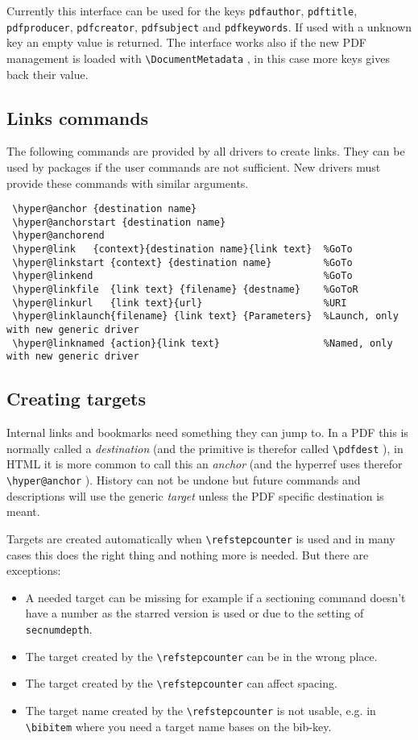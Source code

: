 \documentclass{article}
\newcommand*{\cs}[1]{%
  \texttt{\textbackslash #1}%
}
\newcommand*{\xpackage}[1]{\textsf{#1}}
\begin{document}
Currently this interface can be used for the keys \texttt{pdfauthor}, \texttt{pdftitle},
\texttt{pdfproducer},
\texttt{pdfcreator}, \texttt{pdfsubject} and \texttt{pdfkeywords}.
If used with a unknown key an empty value is returned.
The interface works also if the new PDF management is loaded with \cs{DocumentMetadata}, in this
case more keys gives back their value.


\subsection{Links commands}
The following commands are provided by all drivers to create links.
They can be used by packages if the user commands are not sufficient.
New drivers must provide these commands with similar arguments.

\begin{verbatim}
 \hyper@anchor {destination name}
 \hyper@anchorstart {destination name}
 \hyper@anchorend
 \hyper@link   {context}{destination name}{link text}  %GoTo
 \hyper@linkstart {context} {destination name}         %GoTo
 \hyper@linkend                                        %GoTo
 \hyper@linkfile  {link text} {filename} {destname}    %GoToR
 \hyper@linkurl   {link text}{url}                     %URI
 \hyper@linklaunch{filename} {link text} {Parameters}  %Launch, only with new generic driver
 \hyper@linknamed {action}{link text}                  %Named, only with new generic driver
\end{verbatim}

\subsection{Creating targets}

Internal links and bookmarks need something they can jump to. In a PDF this is normally called
a \emph{destination} (and the primitive is therefor called \cs{pdfdest}), in HTML it is more
common to call this an \emph{anchor} (and the \xpackage{hyperref} uses therefor \cs{hyper@anchor}).
History can not be undone but future commands and descriptions will use the generic
\emph{target} unless the PDF specific destination is meant.

Targets are created automatically when \cs{refstepcounter} is used and in many cases this
does the right thing and nothing more is needed.
But there are exceptions:
\begin{itemize}
\item A needed target can be missing for example
if a sectioning command doesn't have a number as the starred version is used or due to the
setting of \texttt{secnumdepth}.
\item The target created by the \cs{refstepcounter} can be in the wrong place.
\item The target created by the \cs{refstepcounter} can affect spacing.
\item The target name created by the \cs{refstepcounter} is not usable, e.g. in
\cs{bibitem} where you need a target name bases on the bib-key.
\end{itemize}
\end{document}
